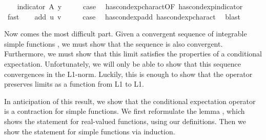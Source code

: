 \begin{isabellebody}
\isanewline
\ \ \isamarkupfalse%
\ {\isacharparenleft}{\kern0pt}indicator\ A\ y{\isacharparenright}{\kern0pt}\isanewline
\ \ \isamarkupfalse%
\ \isamarkupfalse%
\ {\isacharquery}{\kern0pt}case\ \isamarkupfalse%
\ has{\isacharunderscore}{\kern0pt}cond{\isacharunderscore}{\kern0pt}exp{\isacharunderscore}{\kern0pt}charact{\isacharbrackleft}{\kern0pt}OF\ has{\isacharunderscore}{\kern0pt}cond{\isacharunderscore}{\kern0pt}exp{\isacharunderscore}{\kern0pt}indicator{\isacharbrackright}{\kern0pt}\ \isamarkupfalse%
\ fast\isanewline
{}\isamarkupfalse%
\isanewline
\ \ \isamarkupfalse%
\ {\isacharparenleft}{\kern0pt}add\ u\ v{\isacharparenright}{\kern0pt}\isanewline
\ \ \isamarkupfalse%
\ \isamarkupfalse%
\ {\isacharquery}{\kern0pt}case\ \isamarkupfalse%
\ has{\isacharunderscore}{\kern0pt}cond{\isacharunderscore}{\kern0pt}exp{\isacharunderscore}{\kern0pt}add\ has{\isacharunderscore}{\kern0pt}cond{\isacharunderscore}{\kern0pt}exp{\isacharunderscore}{\kern0pt}charact{\isacharparenleft}{\kern0pt}{}{\isacharparenright}{\kern0pt}\ \isamarkupfalse%
\ blast\isanewline
{}\isamarkupfalse%
%
\endisatagproof
{\isafoldproof}%
%
\isadelimproof
%
\endisadelimproof
%
\begin{isamarkuptext}%
Now comes the most difficult part. Given a convergent sequence of integrable simple functions , 
      we must show that the sequence  is also convergent. Furthermore, we must show that this limit satisfies the properties of a conditional expectation. 
      Unfortunately, we will only be able to show that this sequence convergences in the L1-norm. 
      Luckily, this is enough to show that the operator  preserves limits as a function from L1 to L1.%
\end{isamarkuptext}\isamarkuptrue%
%
\begin{isamarkuptext}%
In anticipation of this result, we show that the conditional expectation operator is a contraction for simple functions.
      We first reformulate the lemma , which shows the statement for real-valued functions, using our definitions. 
      Then we show the statement for simple functions via induction.%

\end{isamarkuptext}
\end{isabellebody}
